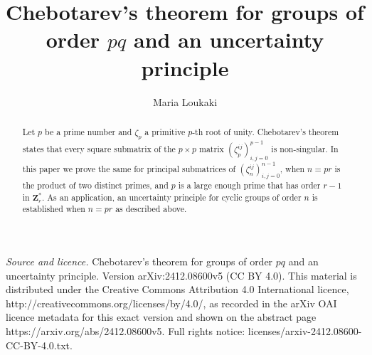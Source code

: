 \documentclass[10pt,a4paper]{amsart}
\begin{document}
\title[Chebotarev's theorem for groups of order pq and an uncertai]{Chebotarev's theorem for groups of order $pq$ and an uncertainty principle}
\author{Maria Loukaki}
\address{Department of Mathematics \& Applied Mathematics, University of Crete, Greece}
\begin{abstract}
Let $p$ be a prime number and $\zeta_p$ a primitive $p$-th root of unity. Chebotarev's theorem states that every square submatrix of the $p \times p$ matrix $(\zeta_p^{ij})_{i,j=0}^{p-1}$ is non-singular. In this  paper we  prove the same for principal  submatrices of $(\zeta_n^{ij})_{i,j=0}^{n-1}$, when  $n=pr$ is the product of two distinct primes, and $p$ is a large enough prime that has order $r-1$ in $\mathbf{Z}_r^*$. As an application,  an uncertainty principle for cyclic groups of order $n$ is established when $n=pr$ as described above.
\end{abstract}
\maketitle
\noindent\emph{Source and licence.} Chebotarev's theorem for groups of order $pq$ and an uncertainty principle. Version arXiv:2412.08600v5 (CC BY 4.0). This material is distributed under the Creative Commons Attribution 4.0 International licence, http://creativecommons.org/licenses/by/4.0/, as recorded in the arXiv OAI licence metadata for this exact version and shown on the abstract page https://arxiv.org/abs/2412.08600v5. Full rights notice: licenses/arxiv-2412.08600-CC-BY-4.0.txt.\par\smallskip
\end{document}
